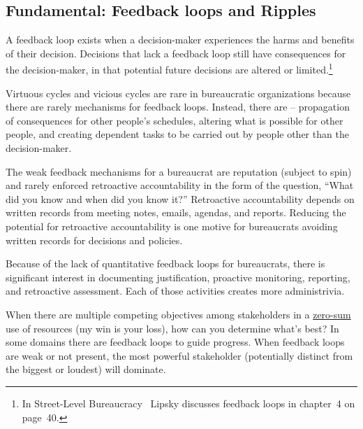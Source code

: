 \subsection*{Fundamental: Feedback loops and Ripples\label{sec:feedback-loop-and-ripples}}



A feedback loop exists when a decision-maker experiences the harms and benefits of their decision. Decisions that lack a feedback loop still have consequences for the decision-maker, in that potential future decisions are altered or limited.\footnote{In Street-Level Bureaucracy~\cite{1983_Lipsky} Lipsky discusses feedback loops in chapter~4 on page~40.}


Virtuous cycles and vicious cycles are rare in bureaucratic organizations because there are rarely mechanisms for feedback loops. 
Instead, there are \iftoggle{glossarysubstitutionworks}{\glspl{ripple}}{ripples} -- propagation of consequences for other people's schedules, 
altering what is possible for other people, and creating dependent tasks to be carried out by people other than the decision-maker.


The weak feedback mechanisms for a bureaucrat are reputation (subject to spin)
and rarely enforced retroactive accountability in the form of the question, ``What did you know and when did you know it?''
Retroactive accountability depends on written records from meeting notes, emails, agendas, and reports. Reducing the potential for retroactive accountability is one motive for bureaucrats avoiding written records for decisions and policies.


Because of the lack of quantitative feedback loops for bureaucrats, there is significant interest in documenting justification, proactive monitoring, reporting, and retroactive assessment. Each of those activities creates more administrivia.


When there are multiple competing objectives among stakeholders in a 
\href{https://en.wikipedia.org/wiki/Zero-sum_game}{zero-sum}
\iftoggle{WPinmargin}{\marginpar{$>$Wikipedia: zero-sum game}}{}
use of resources (my win is your loss), how can you determine what's best? In some domains there are feedback loops to guide progress. When feedback loops are weak or not present,  the most powerful stakeholder (potentially distinct from the biggest or loudest) will dominate. 


